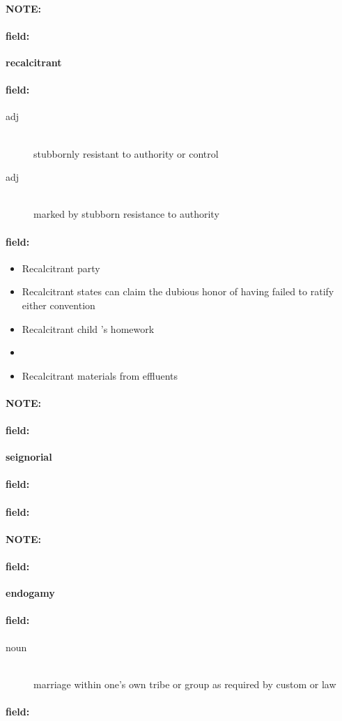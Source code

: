 \documentclass[12pt]{article}
\newenvironment{note}{\paragraph{NOTE:}}{}
\newenvironment{field}{\paragraph{field:}}{}
\begin{document}
\begin{note}
\begin{field}
\textbf{\large recalcitrant}
\end{field}


\begin{field}
\begin{description}
\item[adj] \hfill \\ 
stubbornly resistant to authority or control

\item[adj] \hfill \\ 
marked by stubborn resistance to authority

\end{description}
\end{field}

\begin{field}
\begin{itemize}
\item Recalcitrant party
\item Recalcitrant states can claim the dubious honor of having failed to ratify either convention
\item Recalcitrant child 's homework
\item 
\item Recalcitrant materials from effluents
\end{itemize}
\end{field}
\end{note}
\begin{note}
\begin{field}
\textbf{\large seignorial}
\end{field}


\begin{field}
\end{field}

\begin{field}
\end{field}
\end{note}
\begin{note}
\begin{field}
\textbf{\large endogamy}
\end{field}


\begin{field}
\begin{description}
\item[noun] \hfill \\ 
marriage within one's own tribe or group as required by custom or law

\end{description}
\end{field}

\begin{field}
\end{field}
\end{note}
\end{document}
